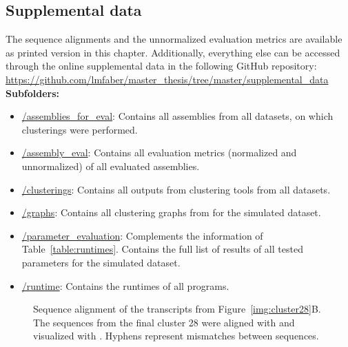 \documentclass[12pt,a4paper,english]{article}
\begin{document}
\subsection{Supplemental data}
\label{appendix:supplements}
The sequence alignments and the unnormalized evaluation metrics are available as printed version in this chapter. Additionally, everything else can be accessed through the online supplemental data in the following GitHub repository:\\
\href{https://github.com/lmfaber/master_thesis/tree/master/supplemental_data}{https://github.com/lmfaber/master\_thesis/tree/master/supplemental\_data}\\
\textbf{Subfolders:}
\begin{itemize}
	\item \href{https://github.com/lmfaber/master_thesis/tree/master/supplemental_data/assemblies_for_eval}{/assemblies\_for\_eval}: Contains all assemblies from all datasets, on which clusterings were performed.
	\item \href{https://github.com/lmfaber/master_thesis/tree/master/supplemental_data/assembly_eval}{/assembly\_eval}: Contains all evaluation metrics (normalized and unnormalized) of all evaluated assemblies.
	\item \href{https://github.com/lmfaber/master_thesis/tree/master/supplemental_data/clusterings}{/clusterings}: Contains all outputs from clustering tools from all datasets.
	\item \href{https://github.com/lmfaber/master_thesis/tree/master/supplemental_data/graphs}{/graphs}: Contains all clustering graphs from \karma for the simulated \celegans dataset.
	\item \href{https://github.com/lmfaber/master_thesis/tree/master/supplemental_data/parameter\_evaluation}{/parameter\_evaluation}: Complements the information of Table~\ref{table:runtimes}. Contains the full list of results of all tested parameters for the simulated \celegans dataset.
	\item \href{https://github.com/lmfaber/master_thesis/tree/master/supplemental_data/runtime}{/runtime}: Contains the runtimes of all programs.

\end{itemize}


\begin{figure}
	\centering
	\def\svgwidth{\textwidth}
	
	\caption[Sequence alignment of the transcripts from Figure~\ref{img:cluster28}B.]{Sequence alignment of the transcripts from Figure~\ref{img:cluster28}B. The sequences from the final cluster 28 were aligned with \muscle \citep{muscle:04} and visualized with \jalview \citep{jalview:09}. Hyphens represent mismatches between sequences.}
	\label{img:aln:case1}
\end{figure}
\end{document}
